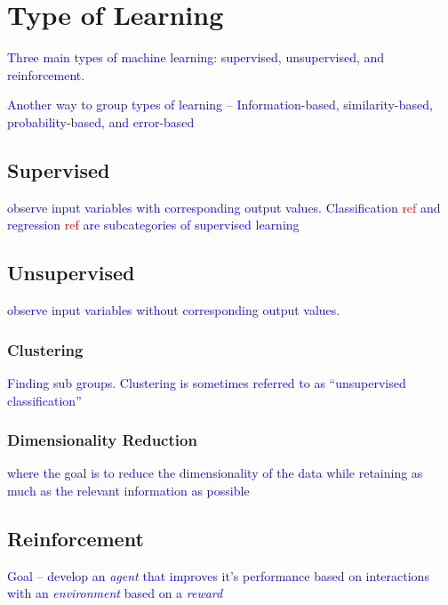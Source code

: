 \section{Type of Learning}

\textcolor{blue}{Three main types of machine learning: supervised, unsupervised, and reinforcement.}

\textcolor{blue}{Another way to group types of learning -- Information-based, similarity-based, probability-based, and error-based}

\subsection{Supervised}

\textcolor{blue}{observe input variables with corresponding output values. Classification \textcolor{red}{ref} and regression \textcolor{red}{ref} are subcategories of supervised learning}

\subsection{Unsupervised}

\textcolor{blue}{observe input variables without corresponding output values.}

\subsubsection{Clustering}

\textcolor{blue}{Finding sub groups. Clustering is sometimes referred to as ``unsupervised classification''}

\subsubsection{Dimensionality Reduction}

\textcolor{blue}{where the goal is to reduce the dimensionality of the data while retaining as much as the relevant information as possible}

\subsection{Reinforcement}

\textcolor{blue}{Goal -- develop an \emph{agent} that improves it's performance based on interactions with an \emph{environment} based on a \emph{reward}}

